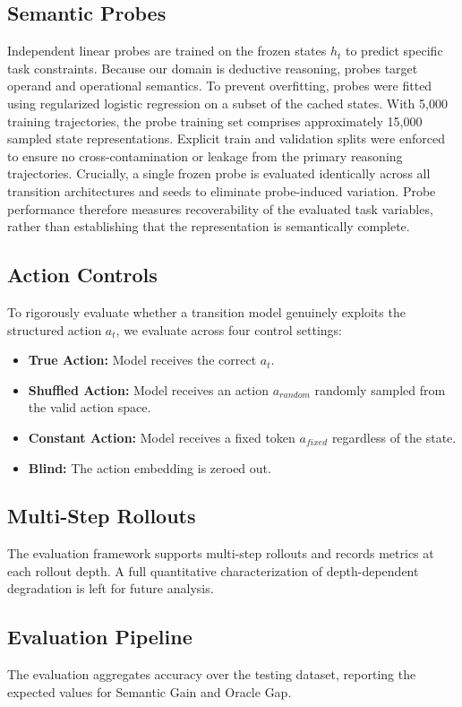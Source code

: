 \documentclass[conference]{IEEEtran}
\begin{document}
\subsection{Semantic Probes}
Independent linear probes are trained on the frozen states $h_t$ to predict specific task constraints. Because our domain is deductive reasoning, probes target operand and operational semantics. To prevent overfitting, probes were fitted using regularized logistic regression on a subset of the cached states. With 5,000 training trajectories, the probe training set comprises approximately 15,000 sampled state representations. Explicit train and validation splits were enforced to ensure no cross-contamination or leakage from the primary reasoning trajectories. Crucially, a single frozen probe is evaluated identically across all transition architectures and seeds to eliminate probe-induced variation. Probe performance therefore measures recoverability of the evaluated task variables, rather than establishing that the representation is semantically complete.

\subsection{Action Controls}
To rigorously evaluate whether a transition model genuinely exploits the structured action $a_t$, we evaluate across four control settings:
\begin{itemize}
    \item \textbf{True Action:} Model receives the correct $a_t$.
    \item \textbf{Shuffled Action:} Model receives an action $a_{random}$ randomly sampled from the valid action space.
    \item \textbf{Constant Action:} Model receives a fixed token $a_{fixed}$ regardless of the state.
    \item \textbf{Blind:} The action embedding is zeroed out.
\end{itemize}

\subsection{Multi-Step Rollouts}
The evaluation framework supports multi-step rollouts and records metrics at each rollout depth. A full quantitative characterization of depth-dependent degradation is left for future analysis.

\subsection{Evaluation Pipeline}
The evaluation aggregates accuracy over the testing dataset, reporting the expected values for Semantic Gain and Oracle Gap.
\end{document}
